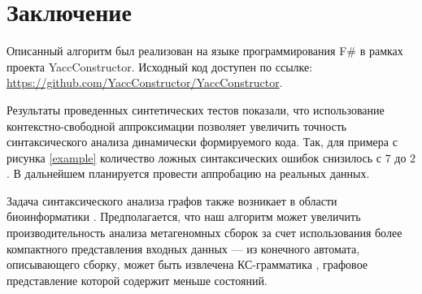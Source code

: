 \section{Заключение}

Описанный алгоритм был реализован на языке программирования F$\#$ в рамках проекта YaccConstructor. Исходный код доступен по ссылке: \url{ https://github.com/YaccConstructor/YaccConstructor}. 

Результаты проведенных синтетических тестов показали, что использование контекстно-свободной аппроксимации позволяет увеличить точность синтаксического анализа динамически формируемого кода. Так, для примера с рисунка \ref{example} количество ложных синтаксических ошибок снизилось с $7$ до $2$. 
В дальнейшем планируется провести аппробацию на реальных данных.

Задача синтаксического анализа графов также возникает в области биоинформатики \cite{gll_reg}. 
Предполагается, что наш алгоритм может увеличить производительность анализа метагеномных сборок за счет использования более компактного представления входных данных --- из конечного автомата, описывающего сборку, может быть извлечена КС-грамматика \cite{cf_extr}, графовое представление которой содержит меньше состояний.